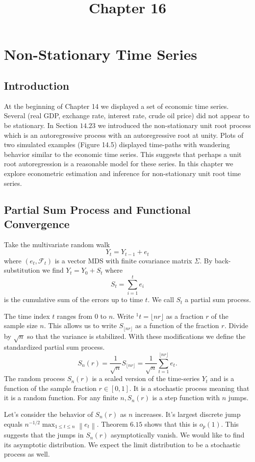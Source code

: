 \documentclass[10pt]{article}
\title{Chapter 16 }
\author{}
\date{}
\begin{document}
\maketitle
\section{Non-Stationary Time Series}
\subsection{Introduction}
At the beginning of Chapter 14 we displayed a set of economic time series. Several (real GDP, exchange rate, interest rate, crude oil price) did not appear to be stationary. In Section $14.23$ we introduced the non-stationary unit root process which is an autoregressive process with an autoregressive root at unity. Plots of two simulated examples (Figure 14.5) displayed time-paths with wandering behavior similar to the economic time series. This suggests that perhaps a unit root autoregression is a reasonable model for these series. In this chapter we explore econometric estimation and inference for non-stationary unit root time series.

\subsection{Partial Sum Process and Functional Convergence}
Take the multivariate random walk
$$
Y_{t}=Y_{t-1}+e_{t}
$$
where $\left(e_{t}, \mathscr{F}_{t}\right)$ is a vector MDS with finite covariance matrix $\Sigma$. By back-substitution we find $Y_{t}=Y_{0}+S_{t}$ where
$$
S_{t}=\sum_{i=1}^{t} e_{i}
$$
is the cumulative sum of the errors up to time $t$. We call $S_{t}$ a partial sum process.

The time index $t$ ranges from 0 to $n$. Write ${ }^{1} t=\lfloor n r\rfloor$ as a fraction $r$ of the sample size $n$. This allows us to write $S_{\lfloor n r\rfloor}$ as a function of the fraction $r$. Divide by $\sqrt{n}$ so that the variance is stabilized. With these modifications we define the standardized partial sum process.
$$
S_{n}(r)=\frac{1}{\sqrt{n}} S_{\lfloor n r\rfloor}=\frac{1}{\sqrt{n}} \sum_{t=1}^{\lfloor n r\rfloor} e_{t} .
$$
The random process $S_{n}(r)$ is a scaled version of the time-series $Y_{t}$ and is a function of the sample fraction $r \in[0,1]$. It is a stochastic process meaning that it is a random function. For any finite $n, S_{n}(r)$ is a step function with $n$ jumps.

Let's consider the behavior of $S_{n}(r)$ as $n$ increases. It's largest discrete jump equals $n^{-1 / 2} \max _{1 \leq t \leq n}\left\|e_{t}\right\|$. Theorem $6.15$ shows that this is $o_{p}(1)$. This suggests that the jumps in $S_{n}(r)$ asymptotically vanish. We would like to find its asymptotic distribution. We expect the limit distribution to be a stochastic process as well.
\end{document}
